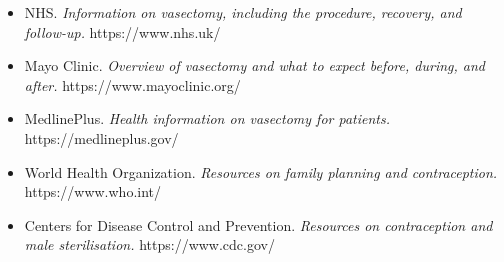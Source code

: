 \begin{itemize}
    \item NHS. \textit{Information on vasectomy, including the procedure, recovery, and follow-up.} https://www.nhs.uk/
    \item Mayo Clinic. \textit{Overview of vasectomy and what to expect before, during, and after.} https://www.mayoclinic.org/
    \item MedlinePlus. \textit{Health information on vasectomy for patients.} https://medlineplus.gov/
    \item World Health Organization. \textit{Resources on family planning and contraception.} https://www.who.int/
    \item Centers for Disease Control and Prevention. \textit{Resources on contraception and male sterilisation.} https://www.cdc.gov/
\end{itemize}
